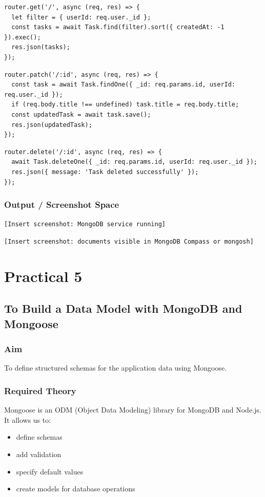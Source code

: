 \documentclass[12pt,a4paper]{article}
\begin{document}
\begin{lstlisting}[style=projectcode]
router.get('/', async (req, res) => {
  let filter = { userId: req.user._id };
  const tasks = await Task.find(filter).sort({ createdAt: -1 }).exec();
  res.json(tasks);
});
\end{lstlisting}

\begin{lstlisting}[style=projectcode]
router.patch('/:id', async (req, res) => {
  const task = await Task.findOne({ _id: req.params.id, userId: req.user._id });
  if (req.body.title !== undefined) task.title = req.body.title;
  const updatedTask = await task.save();
  res.json(updatedTask);
});
\end{lstlisting}

\begin{lstlisting}[style=projectcode]
router.delete('/:id', async (req, res) => {
  await Task.deleteOne({ _id: req.params.id, userId: req.user._id });
  res.json({ message: 'Task deleted successfully' });
});
\end{lstlisting}

\subsubsection*{Output / Screenshot Space}
\texttt{[Insert screenshot: MongoDB service running]}

\texttt{[Insert screenshot: documents visible in MongoDB Compass or mongosh]}

\section*{Practical 5}
\subsection*{To Build a Data Model with MongoDB and Mongoose}

\subsubsection*{Aim}
To define structured schemas for the application data using Mongoose.

\subsubsection*{Required Theory}
Mongoose is an ODM (Object Data Modeling) library for MongoDB and Node.js. It allows us to:
\begin{itemize}
  \item define schemas
  \item add validation
  \item specify default values
  \item create models for database operations
\end{itemize}
\end{document}
